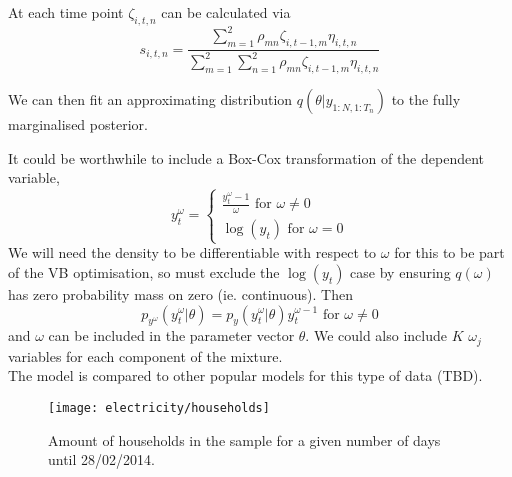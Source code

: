 \documentclass[12pt,a4paper]{article}\usepackage[]{graphicx}\usepackage[]{color}
\begin{document}
At each time point $\zeta_{i, t, n}$ can be calculated via
\begin{equation}
s_{i, t, n} = \frac{ \sum_{m=1}^2 \rho_{mn} \zeta_{i, t-1, m} \eta_{i, t, n}}{ \sum_{m=1}^2 \sum_{n=1}^2 \rho_{mn} \zeta_{i, t-1, m} \eta_{i, t, n}}
\end{equation}

We can then fit an approximating distribution $q(\theta | y_{1:N, 1:T_n})$ to the fully marginalised posterior.

It could be worthwhile to include a Box-Cox transformation of the dependent variable,
\begin{equation}
y_t^{\omega} = \left\{ \begin{array}{c} \frac{y_t^{\omega} - 1}{\omega}\mbox{ for } \omega \neq 0 \\ \log(y_t) \mbox{ for } \omega = 0\end{array}\right.
\end{equation}
We will need the density to be differentiable with respect to $\omega$ for this to be part of the VB optimisation, so must exclude the $\log(y_t)$ case by ensuring $q(\omega)$ has zero probability mass on zero (ie. continuous). Then 
\begin{equation}
p_{y^{\omega}}(y_t^{\omega} | \theta) = p_y(y_t^{\omega} | \theta) y_t^{\omega - 1} \mbox{ for } \omega \neq 0
\end{equation}
and $\omega$ can be included in the parameter vector $\theta$. We could also include $K$ $\omega_j$ variables for each component of the mixture. 
\\

The model is compared to other popular models for this type of data (TBD).

\begin{figure}
\centering
\texttt{[image: electricity/households]}
\caption{Amount of households in the sample for a given number of days until 28/02/2014.}
\end{figure}




\end{document}
